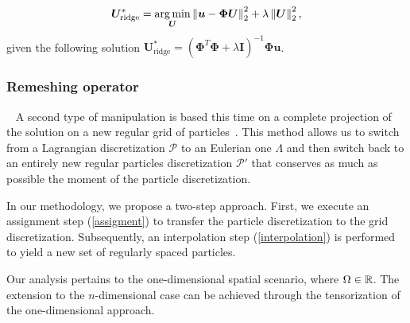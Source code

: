 \begin{equation*}
	\bm{U}_{\text{ridge}}^* = \operatorname*{arg\,min}_{\bm{U}} \left\lVert \bm{u} - \bm \Phi \bm{U} \right\rVert_2^2 + \lambda \left\lVert \bm{U} \right\rVert^2_2,
\end{equation*}given the following solution $\bm{U}^*_{\text{ridge}} = (\bm \Phi^T \bm \Phi + \lambda \bm I)^{-1} \bm \Phi \bm{u}$.

\subsubsection{Remeshing operator}~\label{remesh_part}
A second type of manipulation is based this time on a complete projection of the solution on a new regular grid of particles~\cite{cottet_vortex_2000,cottet_multi-purpose_1999}. This method allows us to switch from a Lagrangian discretization $\mathcal P$ to an Eulerian one $\Lambda$ and then switch back to an entirely new regular particles discretization $\mathcal P'$ that conserves as much as possible the moment of the particle discretization.

In our methodology, we propose a two-step approach. First, we execute an assignment step (\ref{assigment}) to transfer the particle discretization to the grid discretization. Subsequently, an interpolation step (\ref{interpolation}) is performed to yield a new set of regularly spaced particles.

Our analysis pertains to the one-dimensional spatial scenario, where $\Omega \in \mathbb{R}$. The extension to the $n$-dimensional case can be achieved through the tensorization of the one-dimensional approach.

